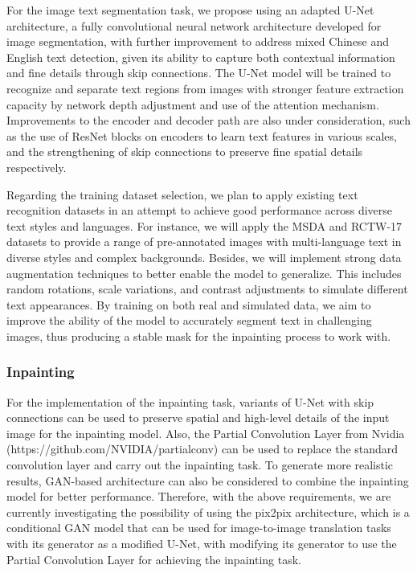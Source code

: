 \documentclass[10pt,twocolumn,letterpaper]{article}
\begin{document}

For the image text segmentation task, we propose using an adapted U-Net architecture, a fully convolutional neural network architecture 
developed for image segmentation, with further improvement to address mixed Chinese and English text detection, given its ability to capture 
both contextual information and fine details through skip connections. 
The U-Net model will be trained to recognize and separate text regions from images with stronger feature extraction capacity by network depth 
adjustment and use of the attention mechanism. Improvements to the encoder and decoder path are also under consideration, 
such as the use of ResNet blocks on encoders to learn text features in various scales, and the strengthening of skip connections to preserve fine spatial details respectively.

Regarding the training dataset selection, we plan to apply existing text recognition datasets in an attempt to achieve good performance 
across diverse text styles and languages. For instance, we will apply the MSDA and RCTW-17 datasets to provide a range of pre-annotated images 
with multi-language text in diverse styles and complex backgrounds. 
Besides, we will implement strong data augmentation techniques to better enable the model to generalize. This includes random rotations, 
scale variations, and contrast adjustments to simulate different text appearances. 
By training on both real and simulated data, we aim to improve the ability of the model to accurately segment text in challenging images, 
thus producing a stable mask for the inpainting process to work with.

\subsubsection{Inpainting}


For the implementation of the inpainting task, variants of U-Net with skip connections can be used to preserve spatial and high-level 
details of the input image for the inpainting model. Also, the Partial Convolution Layer from Nvidia 
(https://github.com/NVIDIA/partialconv) can be used to replace the standard convolution layer and carry out the inpainting task. To 
generate more realistic results, GAN-based architecture can also be considered to combine the inpainting model for better performance.
Therefore, with the above requirements, we are currently investigating the possibility of using the pix2pix architecture,
which is a conditional GAN model that can be used for image-to-image translation tasks with its generator as a modified U-Net, 
with modifying its generator to use the Partial Convolution Layer for achieving the inpainting task.
\end{document}
